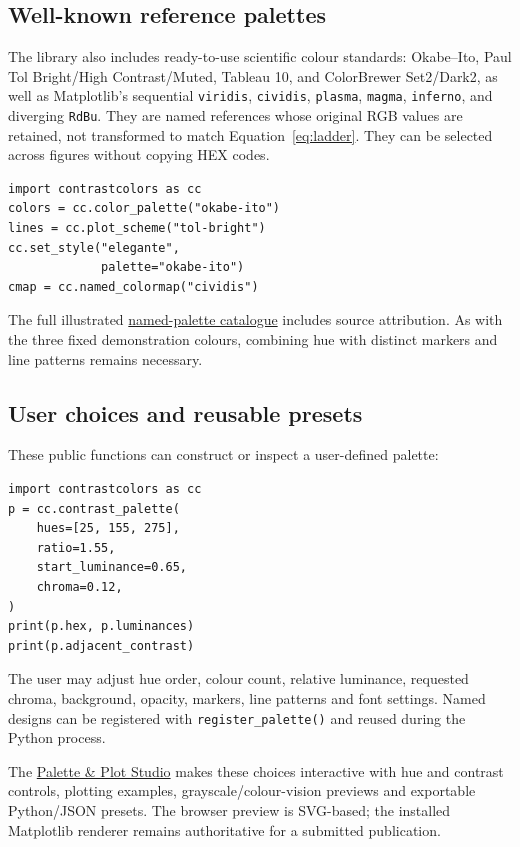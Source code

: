 \documentclass[10pt,twocolumn,a4paper]{article}
\begin{document}
\subsection{Well-known reference palettes}
The library also includes ready-to-use scientific colour standards:
Okabe--Ito, Paul Tol Bright/High Contrast/Muted, Tableau 10,
and ColorBrewer Set2/Dark2, as well as Matplotlib's sequential
\texttt{viridis}, \texttt{cividis}, \texttt{plasma},
\texttt{magma}, \texttt{inferno}, and diverging \texttt{RdBu}.
They are named references whose original RGB values are retained,
not transformed to match Equation~\ref{eq:ladder}.
They can be selected across figures without copying HEX codes.

\begin{verbatim}
import contrastcolors as cc
colors = cc.color_palette("okabe-ito")
lines = cc.plot_scheme("tol-bright")
cc.set_style("elegante",
             palette="okabe-ito")
cmap = cc.named_colormap("cividis")
\end{verbatim}
The full illustrated \href{https://heri-espino.github.io/Colors/named_palettes.html}
{named-palette catalogue} includes source attribution.
As with the three fixed demonstration colours, combining
hue with distinct markers and line patterns remains necessary.

\subsection{User choices and reusable presets}
These public functions can construct or inspect a
user-defined palette:
\begin{verbatim}
import contrastcolors as cc
p = cc.contrast_palette(
    hues=[25, 155, 275],
    ratio=1.55,
    start_luminance=0.65,
    chroma=0.12,
)
print(p.hex, p.luminances)
print(p.adjacent_contrast)
\end{verbatim}
The user may adjust hue order, colour count,
relative luminance, requested chroma, background,
opacity, markers, line patterns and font settings.
Named designs can be registered with
\texttt{register\_palette()} and reused during the
Python process.

The \href{https://heri-espino.github.io/Colors/studio.html}
{Palette \& Plot Studio} makes these choices interactive
with hue and contrast controls, plotting examples,
grayscale/colour-vision previews and exportable
Python/JSON presets. The browser preview is SVG-based;
the installed Matplotlib renderer remains authoritative
for a submitted publication.
\end{document}
